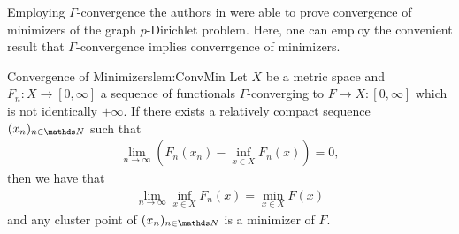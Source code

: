 %
%
Employing $\Gamma$-convergence the authors in \cite{slepcev2019analysis} were able to prove convergence of minimizers of the graph $p$-Dirichlet problem. Here, one can employ the convenient result that $\Gamma$-convergence implies converrgence of minimizers.
%
\begin{lemma}{\cite[Thm. 1.21]{Brad02} Convergence of Minimizers}{lem:ConvMin}
	Let $X$ be a metric space and $F_n:X\rightarrow [0,\infty]$ a sequence of 
	functionals $\Gamma$-converging to $F\rightarrow X:[0,\infty]$ which is not 
	identically $+\infty$. 
	If there exists a relatively compact sequence $(x_n)_{n\in\N}$ such that 
	\begin{align*}
		\lim_{n\rightarrow\infty} \left(F_n(x_n) - \inf_{x\in X} F_n(x)\right) = 0, 
	\end{align*}
	then we have that 
	\begin{align*}
		\lim_{n\rightarrow\infty} \inf_{x\in X} F_n(x) = \min_{x\in X} F(x)
	\end{align*}
	and any cluster point of $(x_n)_{n\in\N}$ is a minimizer of $F$.
\end{lemma}
%
%
